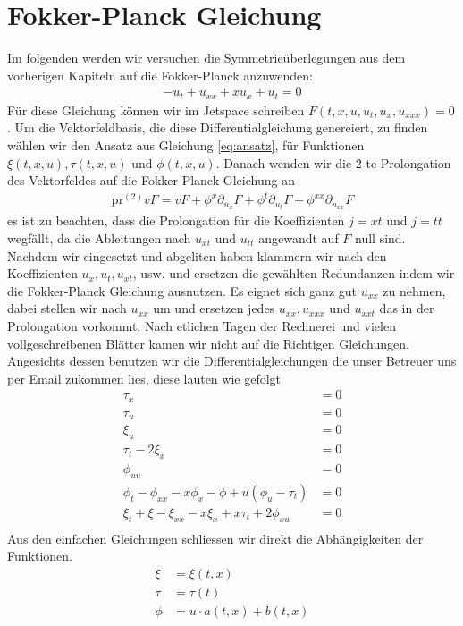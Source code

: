 \documentclass[a4paper]{article}
\begin{document}
\section{Fokker-Planck Gleichung}
Im folgenden werden wir versuchen die Symmetrieüberlegungen aus dem
vorherigen Kapiteln auf die Fokker-Planck anzuwenden:
\begin{align}
    -u_t + u_{xx} + xu_x + u_t = 0
\end{align}
Für diese Gleichung können wir im Jetspace schreiben $F(t, x, u, u_t, u_{x},
u_{xxx}) = 0$. Um die Vektorfeldbasis, die diese Differentialgleichung
genereiert, zu finden wählen wir den Ansatz aus Gleichung \ref{eq:ansatz},
für Funktionen $\xi(t,x,u),\tau(t,x,u)$ und $\phi(t,x,u)$. Danach wenden
wir die 2-te Prolongation des Vektorfeldes auf die Fokker-Planck Gleichung an
\begin{align}
    \text{pr}^{(2)}vF=vF + \phi^x \partial_{u_x}F+\phi^t\partial_{u_t}F
    +\phi^{xx}\partial_{u_{xx}}F
\end{align}
es ist zu beachten, dass die Prolongation für die Koeffizienten $j=xt$ und
$j=tt$ wegfällt, da
die Ableitungen nach $u_{xt}$ und $u_{tt}$ angewandt auf $F$ null sind.
Nachdem wir eingesetzt und abgeliten haben klammern wir nach den
Koeffizienten $u_{x}, u_{t}, u_{xt}$, usw. und ersetzen die gewählten
Redundanzen indem wir die Fokker-Planck Gleichung ausnutzen. Es eignet sich
ganz gut $u_{xx}$ zu nehmen, dabei stellen wir nach $u_{xx}$ um und ersetzen
jedes $u_{xx}, u_{xxx}$ und  $u_{xxt}$ das in der Prolongation vorkommt. Nach
etlichen Tagen der Rechnerei und vielen vollgeschreibenen Blätter kamen wir
nicht auf die Richtigen Gleichungen. Angesichts dessen benutzen wir die
Differentialgleichungen die unser Betreuer uns per Email zukommen lies, diese
lauten wie gefolgt
\begin{align}
\tau_x &= 0\\
\tau_u &= 0\\
\xi_u &= 0\\
    \tau_t - 2\xi_x&=0\label{eq:einfach}\\
\phi_{uu} &= 0\\
\phi_t - \phi_{xx} - x\phi_x - \phi + u(\phi_u - \tau_t) &=
    0\label{eq:2}\\
    \xi_t + \xi - \xi_{xx} - x\xi_x + x\tau_t + 2\phi_{xu} &=
    0\label{eq:1}\\
\end{align}
Aus den einfachen Gleichungen schliessen wir direkt die Abhängigkeiten der
Funktionen.
\begin{align}
    \xi &= \xi(t,x)\\
    \tau &= \tau(t)\\
    \phi &= u \cdot a(t,x) + b(t,x)
\end{align}
\end{document}

